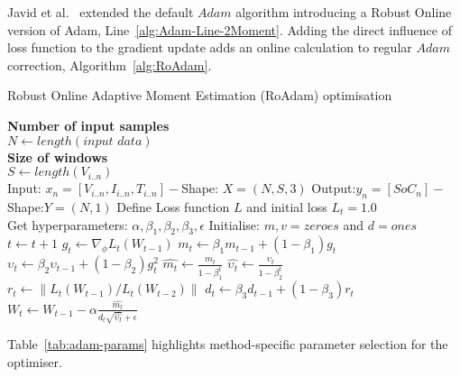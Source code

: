 %
%
Javid et al.~\cite{javid_adaptive_2020} extended the default $Adam$ algorithm introducing a Robust Online version of Adam, Line~\ref{alg:Adam-Line-2Moment}.
Adding the direct influence of loss function to the gradient update adds an online calculation to regular $Adam$ correction, \mbox{Algorithm~\ref{alg:RoAdam}}.
\begin{algorithm}
  \caption{Robust Online Adaptive Moment Estimation (RoAdam) optimisation}
  \begin{algorithmic}[1]
    \STATE \textbf{Number of input samples} \\ $N\gets length(\textit{input data})$\\
    \STATE \textbf{Size of windows} \\ $S\gets length(V_{i..n})$\\
    \STATE Input: $x_n = [V_{i..n}, I_{i..n}, T_{i..n}] - $Shape: $X = (N, S, 3)$
    \STATE Output:$y_n = [SoC_{n}] - $Shape:$Y = (N, 1)$
    \STATE Define Loss function $L$ and initial loss $L_t = 1.0$ \\
           Get hyperparameters: $\alpha, \beta_1, \beta_2, \beta_3, \epsilon$
    \STATE Initialise: $m,v=zeroes$ and $d=ones$ \\
    \STATE $t \gets t+1$
    \STATE $g_t \gets \nabla_\phi L_t (W_{t-1})$ 
    \STATE $m_t \gets \beta_1 m_{t-1}+(1-\beta_1) g_t $ 
    \STATE $\upsilon_t \gets \beta_2 \upsilon_{t-1}+ \left(1-\beta_2 \right)g^2_t $ 
    \STATE $\hat{m_t} \gets \frac{m_t}{1-\beta^t_1}$ 
    \STATE $\hat{\upsilon_t} \gets \frac{\upsilon_t}{1-\beta^t_2} $ 
    \STATE $r_t \gets \parallel L_t\left(W_{t-1}\right)/L_t\left(W_{t-2}\right) \parallel $ 
    \STATE $d_t \gets \beta_3 d_{t-1}+\left(1-\beta_3\right)r_t $ 
    \STATE $W_t \gets W_{t-1}- \alpha \frac{\hat{m_t}}{d_t\sqrt{\hat{\upsilon_t}}+\epsilon} $ 
    \ENDWHILE
  \end{algorithmic}
  \label{alg:RoAdam}
\end{algorithm}
\mbox{Table~\ref{tab:adam-params}} highlights method-specific parameter selection for the optimiser.
